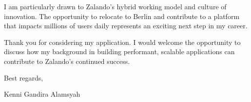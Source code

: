 \documentclass[12pt]{article}
\newcommand{\mvspace}{\vspace*{1.5em}}
\begin{document}
I am particularly drawn to Zalando's hybrid working model and culture of innovation. The opportunity to relocate to Berlin and contribute to a platform that impacts millions of users daily represents an exciting next step in my career.

Thank you for considering my application. I would welcome the opportunity to discuss how my background in building performant, scalable applications can contribute to Zalando's continued success.

\mvspace

Best regards,

Kenni Gandira Alamsyah
\end{document}
